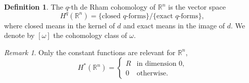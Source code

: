 \documentclass[twocolumn]{article}
\theoremstyle{definition}
\newtheorem{definition}{Definition}[section]
\theoremstyle{remark}
\newtheorem*{remark}{Remark}
\begin{document}
\begin{definition}
    The $q$-th de Rham cohomology of $\mathbb{R}^n$ is the vector space
    \begin{equation}
        H^q(\mathbb{R}^n) = \{\textrm{closed $q$-forms}\}/\{\textrm{exact $q$-forms}\},
    \end{equation}
    where closed means in the kernel of $d$ and exact means in the image of $d$.
    We denote by $[\omega]$ the cohomology class of $\omega$.
\end{definition}
\begin{remark}
    Only the constant functions are relevant for $\mathbb{R}^n$,
    \begin{equation}
        H^*(\mathbb{R}^n) =
        \begin{cases}
            R & \textrm{in dimension 0,}\\
            0 & \textrm{otherwise.}
        \end{cases}
    \end{equation}
\end{remark}
\end{document}

